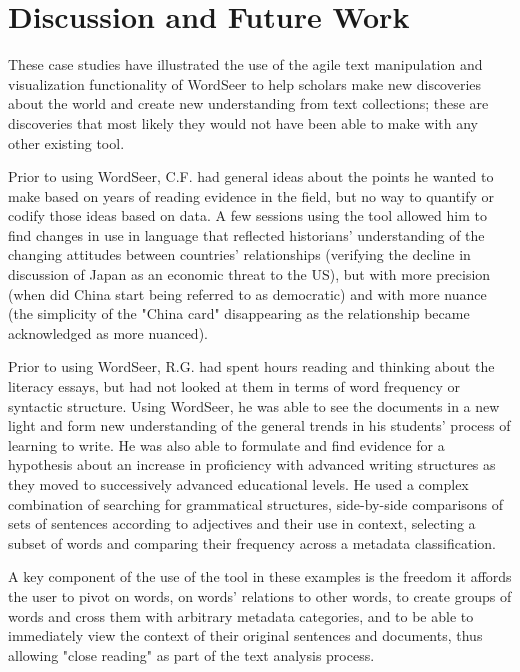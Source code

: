




\section{Discussion and Future Work}

These case studies have illustrated the use of the agile text manipulation and visualization functionality of WordSeer to help scholars make new discoveries about the world and create new understanding from text collections; these are discoveries that most likely they would not have been able to make with any other existing tool.

Prior to using WordSeer, C.F. had general ideas about the points he wanted to make based on years of reading evidence in the field, but no way to quantify or codify those ideas based on data.  A few sessions using the tool allowed him to find changes in use in language that reflected historians' understanding of the changing attitudes between countries' relationships (verifying the decline in discussion of Japan as an economic threat to the US), but with more precision (when did China start being referred to as democratic) and with more nuance (the simplicity of the "China card" disappearing as the relationship became acknowledged as more nuanced).


Prior to using WordSeer, R.G. had spent hours reading and thinking about the literacy essays, but had not looked at them in terms of word frequency or syntactic structure.  Using WordSeer, he was able to see the documents in a new light and form new  understanding of the general trends in his students' process of learning to write.   He was also able to formulate and find evidence for a hypothesis about an increase in proficiency with advanced writing structures as they moved to successively advanced educational levels.   He used a complex combination of searching for grammatical structures, side-by-side comparisons of sets of sentences according to adjectives and their use in context, selecting a subset of words and comparing their frequency across a metadata classification.  

A key component of the use of the tool in these examples is the freedom it affords the user to pivot on words, on words' relations to other words, to create groups of words and cross them with arbitrary metadata categories, and to be able to immediately view  the context of their original sentences and documents, thus allowing "close reading" as part of the text analysis process.

